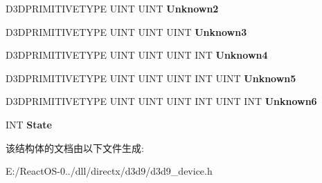 \begin{DoxyCompactItemize}
D3\+D\+P\+R\+I\+M\+I\+T\+I\+V\+E\+T\+Y\+PE U\+I\+NT U\+I\+NT {\bfseries Unknown2}
\item 
\mbox{\label{struct___i_direct3_d_device9_vtbl___i_n_t_a3fd584a30fc266cbc73291a2baee90a1}} 
D3\+D\+P\+R\+I\+M\+I\+T\+I\+V\+E\+T\+Y\+PE U\+I\+NT U\+I\+NT U\+I\+NT {\bfseries Unknown3}
\item 
\mbox{\label{struct___i_direct3_d_device9_vtbl___i_n_t_a958f1654d95b9e638fe7e74fcbad7500}} 
D3\+D\+P\+R\+I\+M\+I\+T\+I\+V\+E\+T\+Y\+PE U\+I\+NT U\+I\+NT U\+I\+NT I\+NT {\bfseries Unknown4}
\item 
\mbox{\label{struct___i_direct3_d_device9_vtbl___i_n_t_a62ab4821ab2172373dc6dfdc766c0274}} 
D3\+D\+P\+R\+I\+M\+I\+T\+I\+V\+E\+T\+Y\+PE U\+I\+NT U\+I\+NT U\+I\+NT I\+NT U\+I\+NT {\bfseries Unknown5}
\item 
\mbox{\label{struct___i_direct3_d_device9_vtbl___i_n_t_a65e6cdacea55a4567985395468643d1f}} 
D3\+D\+P\+R\+I\+M\+I\+T\+I\+V\+E\+T\+Y\+PE U\+I\+NT U\+I\+NT U\+I\+NT I\+NT U\+I\+NT I\+NT {\bfseries Unknown6}
\item 
\mbox{\label{struct___i_direct3_d_device9_vtbl___i_n_t_a387920a0b987acc2cc063556db780e1f}} 
I\+NT {\bfseries State}
\end{DoxyCompactItemize}


该结构体的文档由以下文件生成\+:\begin{DoxyCompactItemize}
\item 
E\+:/\+React\+O\+S-\/0../dll/directx/d3d9/d3d9\+\_\+device.\+h\end{DoxyCompactItemize}
